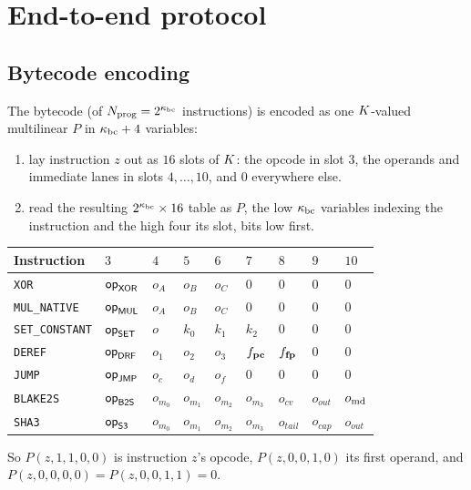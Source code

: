 \section{End-to-end protocol}\label{sec:e2e}

\subsection{Bytecode encoding}\label{sec:e2e-bc}

The bytecode (of $N_{\mathrm{prog}}=2^{\kappa_{\mathrm{bc}}}$ instructions) is encoded as one $K$-valued multilinear $P$ in $\kappa_{\mathrm{bc}}+4$ variables:
\begin{enumerate}[itemsep=1pt,topsep=3pt]
\item lay instruction $z$ out as $16$ slots of $K$: the opcode in slot $3$, the operands and immediate lanes in slots $4,\dots,10$, and $0$ everywhere else.
\item read the resulting $2^{\kappa_{\mathrm{bc}}}\times16$ table as $P$, the low $\kappa_{\mathrm{bc}}$ variables indexing the instruction and the high four its slot, bits low first.
\end{enumerate}
\begin{center}
\begin{tabular}{lllllllll}
\hline
Instruction & $3$ & $4$ & $5$ & $6$ & $7$ & $8$ & $9$ & $10$\\
\hline
\texttt{XOR}           & $\mathsf{op}_{\mathsf{XOR}}$ & $o_A$ & $o_B$ & $o_C$ & $0$ & $0$ & $0$ & $0$\\
\texttt{MUL\_NATIVE}   & $\mathsf{op}_{\mathsf{MUL}}$ & $o_A$ & $o_B$ & $o_C$ & $0$ & $0$ & $0$ & $0$\\
\texttt{SET\_CONSTANT} & $\mathsf{op}_{\mathsf{SET}}$ & $o$   & $k_0$ & $k_1$ & $k_2$ & $0$ & $0$ & $0$\\
\texttt{DEREF}         & $\mathsf{op}_{\mathsf{DRF}}$ & $o_1$ & $o_2$ & $o_3$ & $f_{\mathbf{pc}}$ & $f_{\mathbf{fp}}$ & $0$ & $0$\\
\texttt{JUMP}          & $\mathsf{op}_{\mathsf{JMP}}$ & $o_c$ & $o_d$ & $o_f$ & $0$ & $0$ & $0$ & $0$\\
\texttt{BLAKE2S}        & $\mathsf{op}_{\mathsf{B2S}}$  & $o_{m_0}$ & $o_{m_1}$ & $o_{m_2}$ & $o_{m_3}$ & $o_{\mathit{cv}}$ & $o_{\mathit{out}}$ & $o_{\mathrm{md}}$\\
\texttt{SHA3}           & $\mathsf{op}_{\mathsf{S3}}$  & $o_{m_0}$ & $o_{m_1}$ & $o_{m_2}$ & $o_{m_3}$ & $o_{\mathit{tail}}$ & $o_{\mathit{cap}}$ & $o_{\mathit{out}}$\\
\hline
\end{tabular}
\end{center}
So $P(z,1,1,0,0)$ is instruction $z$'s opcode, $P(z,0,0,1,0)$ its first operand, and $P(z,0,0,0,0)=P(z,0,0,1,1)=0$.

